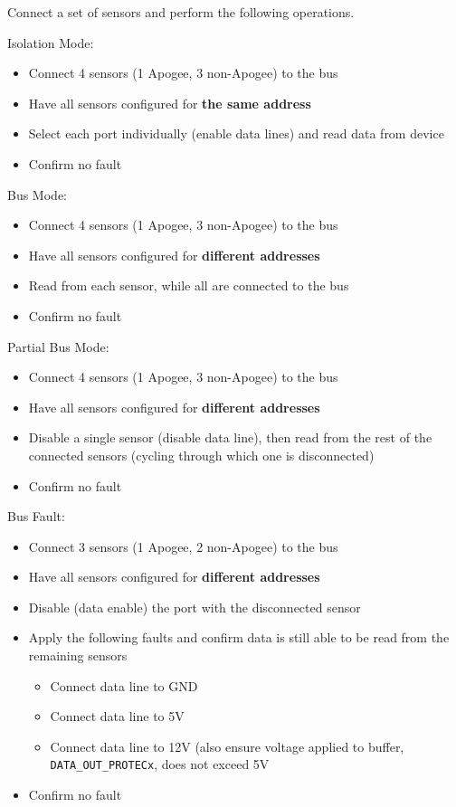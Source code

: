Connect a set of sensors and perform the following operations. 

{\large Isolation Mode: }
\begin{itemize}
\item Connect 4 sensors (1 Apogee, 3 non-Apogee) to the bus
\item Have all sensors configured for \textbf{the same address}
\item Select each port individually (enable data lines) and read data from device
\item Confirm no fault
\end{itemize}

{\large Bus Mode: }
\begin{itemize}
\item Connect 4 sensors (1 Apogee, 3 non-Apogee) to the bus
\item Have all sensors configured for \textbf{different addresses}
\item Read from each sensor, while all are connected to the bus
\item Confirm no fault
\end{itemize}

{\large Partial Bus Mode: }
\begin{itemize}
\item Connect 4 sensors (1 Apogee, 3 non-Apogee) to the bus
\item Have all sensors configured for \textbf{different addresses}
\item Disable a single sensor (disable data line), then read from the rest of the connected sensors (cycling through which one is disconnected)
\item Confirm no fault
\end{itemize}

{\large Bus Fault: }
\begin{itemize}
\item Connect 3 sensors (1 Apogee, 2 non-Apogee) to the bus
\item Have all sensors configured for \textbf{different addresses}
\item Disable (data enable) the port with the disconnected sensor
\item Apply the following faults and confirm data is still able to be read from the remaining sensors 
\begin{itemize}
\item Connect data line to GND
\item Connect data line to 5V
\item Connect data line to 12V (also ensure voltage applied to buffer, \texttt{DATA\_OUT\_PROTECx}, does not exceed 5V
\end{itemize}
\item Confirm no fault
\end{itemize}

